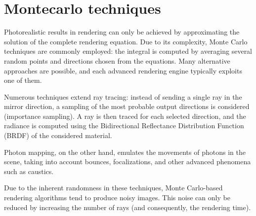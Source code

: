 \section{Montecarlo techniques}

Photorealistic results in rendering can only be achieved by approximating the solution of the complete rendering equation. 
Due to its complexity, Monte Carlo techniques are commonly employed: the integral is computed by averaging several random points and directions chosen from the equations. 
Many alternative approaches are possible, and each advanced rendering engine typically exploits one of them.

Numerous techniques extend ray tracing: instead of sending a single ray in the mirror direction, a sampling of the most probable output directions is considered (importance sampling). 
A ray is then traced for each selected direction, and the radiance is computed using the Bidirectional Reflectance Distribution Function (BRDF) of the considered material.

Photon mapping, on the other hand, emulates the movements of photons in the scene, taking into account bounces, focalizations, and other advanced phenomena such as caustics.

Due to the inherent randomness in these techniques, Monte Carlo-based rendering algorithms tend to produce noisy images. 
This noise can only be reduced by increasing the number of rays (and consequently, the rendering time).